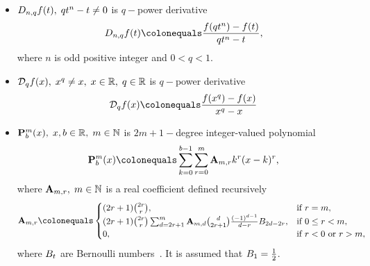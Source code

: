 \begin{itemize}
    \item $D_{n,q} f(t), \; qt^n - t \neq 0$ is $q-$power derivative~\cite{aldwoah2011power}
    \[
        \nqderivative{f(t)} \colonequals \frac{f(qt^n) - f(t)}{qt^n - t},
    \]
    where $n$ is odd positive integer and $0 < q < 1$.

    \item $\mathcal{D}_q f(x), \; x^q \neq x, \; x\in\mathbb{R}, \; q\in\mathbb{R}$ is $q-$power derivative
    \[
        \qpowerDerivative{f(x)} \colonequals \frac{f(x^q)-f(x)}{x^q-x}
    \]

    \item ${\mathbf{P}}\sp{m} \sb{b}(x), \; x,b\in\mathbb{R}, \; m\in\mathbb{N}$ is $2m+1-$degree integer-valued polynomial~\cite{kolosov2016link}
    \begin{equation}
        \polynomialP{m}{b}{x} \colonequals \sum_{k=0}^{b-1} \sum_{r=0}^{m} \coeffA{m}{r} k^r(x-k)^r,
        \label{eq:polynomial_p}
    \end{equation}
    where ${\mathbf{A}} \sb{m,r}, \; m\in\mathbb{N}$ is a real coefficient defined recursively
    \[
        \coeffA{m}{r} \colonequals
        \begin{cases}
        (2r+1)
            \binom{2r}{r}, & \text{if } r=m,\\
            (2r+1) \binom{2r}{r} \sum_{d=2r+1}^{m} \coeffA{m}{d} \binom{d}{2r+1} \frac{(-1)^{d-1}}{d-r}
            \bernoulli{2d-2r}, & \text{if } 0 \leq r<m,\\
            0, & \text{if } r<0 \text{ or } r>m,
        \end{cases}
    \]
    where ${B}\sb{t}$ are Bernoulli numbers~\cite{WeissteinBernoulli}.
    It is assumed that ${B}\sb{1}=\frac{1}{2}$.
\end{itemize}